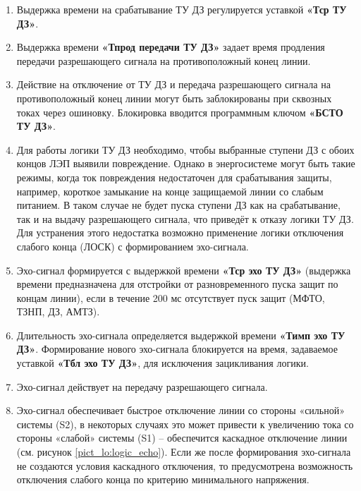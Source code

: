 \begin{enumerate}
\begin{enumerate}
\item
Выдержка времени на срабатывание ТУ ДЗ регулируется уставкой \textbf{«Тср ТУ ДЗ»}.

\item
Выдержка времени \textbf{«Тпрод передачи ТУ ДЗ»} задает время продления передачи разрешающего сигнала на противоположный конец линии. 

\item
Действие на отключение от ТУ ДЗ и передача разрешающего сигнала на противоположный конец линии могут быть заблокированы при сквозных токах через ошиновку. Блокировка вводится программным ключом \textbf{«БСТО ТУ ДЗ»}.


\item
Для работы логики ТУ ДЗ необходимо, чтобы выбранные ступени ДЗ с обоих концов ЛЭП выявили повреждение. Однако в энергосистеме могут быть такие режимы, когда ток повреждения недостаточен для срабатывания защиты, например, короткое замыкание на конце защищаемой линии со слабым питанием. В таком случае не будет пуска ступени ДЗ как на срабатывание, так и на выдачу разрешающего сигнала, что приведёт к отказу логики ТУ ДЗ. Для устранения этого недостатка возможно применение логики отключения слабого конца (ЛОСК) с формированием эхо-сигнала.

\item
Эхо-сигнал формируется с выдержкой времени \textbf{«Тср эхо ТУ ДЗ»} (выдержка времени предназначена для отстройки от разновременного пуска защит по концам линии), если в течение 200 мс отсутствует пуск защит (МФТО, ТЗНП, ДЗ, АМТЗ).

\item
Длительность эхо-сигнала определяется выдержкой времени \textbf{«Тимп эхо ТУ ДЗ»}. Формирование нового эхо-сигнала блокируется на время, задаваемое уставкой \textbf{«Тбл эхо ТУ ДЗ»}, для исключения зацикливания логики.

\item
Эхо-сигнал действует на передачу разрешающего сигнала.

\item
Эхо-сигнал обеспечивает быстрое отключение линии со стороны «сильной» системы (S2), в некоторых случаях это может привести к увеличению тока со стороны «слабой» системы (S1) -- обеспечится каскадное отключение линии (см. рисунок \ref{pict_lo:logic_echo}). Если же после формирования эхо-сигнала не создаются условия каскадного отключения, то предусмотрена возможность отключения слабого конца по критерию минимального напряжения.


\end{enumerate}
\end{enumerate}
